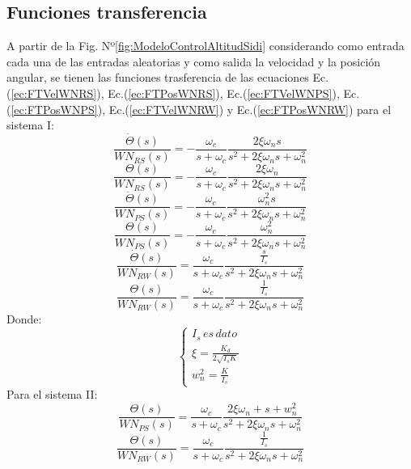 \documentclass[a4paper,11pt,twoside]{IT-CNEA}
\begin{document}
\subsection{Funciones transferencia}
A partir de la Fig. Nº\ref{fig:ModeloControlAltitudSidi} considerando como entrada cada una de las entradas aleatorias y como salida la velocidad y la posición angular, se tienen las funciones trasferencia de las ecuaciones Ec.(\ref{ec:FTVelWNRS}), Ec.(\ref{ec:FTPosWNRS}), Ec.(\ref{ec:FTVelWNPS}), Ec.(\ref{ec:FTPosWNPS}), Ec.(\ref{ec:FTVelWNRW}) y Ec.(\ref{ec:FTPosWNRW}) para el sistema I:
\begin{equation}
\frac{\dot{\Theta}(s)}{WN_{RS}(s)}=-\frac{\omega_c}{s+\omega_c}\frac{2\xi\omega_ns}{s^2+2\xi\omega_ns+\omega_n^2}
\label{ec:FTVelWNRS}
\end{equation}
\begin{equation}
\frac{\Theta (s)}{WN_{RS}(s)}=-\frac{\omega_c}{s+\omega_c}\frac{2\xi\omega_n}{s^2+2\xi\omega_ns+\omega_n^2}
\label{ec:FTPosWNRS}
\end{equation}
\begin{equation}
\frac{\dot{\Theta}(s)}{WN_{PS} (s)}=-\frac{\omega_c}{s+\omega_c}\frac{\omega_n^2s}{s^2+2\xi\omega_ns+\omega_n^2}
\label{ec:FTVelWNPS}
\end{equation}
\begin{equation}
\frac{\Theta (s)}{WN_{PS} (s)}=-\frac{\omega_c}{s+\omega_c}\frac{\omega_n^2}{s^2+2\xi\omega_ns+\omega_n^2}
\label{ec:FTPosWNPS}
\end{equation}
\begin{equation}
\frac{\dot{\Theta}(s)}{WN_{RW} (s)}=\frac{\omega_c}{s+\omega_c}\frac{\frac{s}{I_s}}{s^2+2\xi\omega_ns+\omega_n^2}
\label{ec:FTVelWNRW}
\end{equation}
\begin{equation}
\frac{\Theta (s)}{WN_{RW} (s)}=\frac{\omega_c}{s+\omega_c}\frac{\frac{1}{I_s}}{s^2+2\xi\omega_ns+\omega_n^2}
\label{ec:FTPosWNRW}
\end{equation}
Donde:
\begin{equation}
\begin{cases}
I_s\, es\, dato \\
\xi = \frac{K_d}{2\sqrt{I_sK}} \\
w_n^2=\frac{K}{I_s}
\end{cases}
\end{equation}
Para el sistema II:
\begin{equation}
\frac{\Theta (s)}{WN_{PS} (s)}=\frac{\omega_c}{s+\omega_c}\frac{2\xi\omega_n+s+w_n^2}{s^2+2\xi\omega_ns+\omega_n^2}
\label{ec:FTPosWNPSII}
\end{equation}
\begin{equation}
\frac{\Theta (s)}{WN_{RW} (s)}=\frac{\omega_c}{s+\omega_c}\frac{\frac{1}{I_s}}{s^2+2\xi\omega_ns+\omega_n^2}
\label{ec:FTPosWNRWII}
\end{equation}
\end{document}
